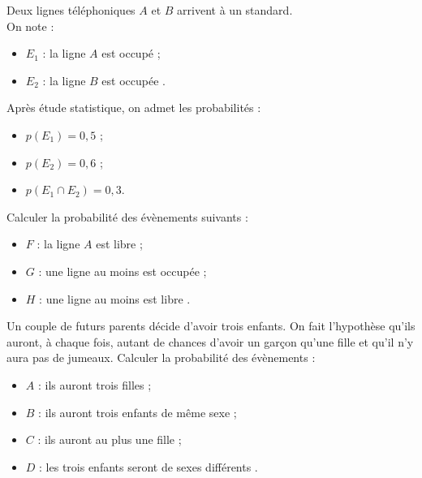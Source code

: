 \begin{exo}
Deux lignes t\'el\'ephoniques $A$ et $B$ arrivent \`a un standard.\\ On note :
\vspace{-1em}\begin{multicols}{2}
\begin{itemize}
	\item $E_1$ : \og la ligne $A$ est occup\'e \fg ;
	\item $E_2$ : \og la ligne $B$ est occup\'ee \fg.
\end{itemize}
\end{multicols}\vspace{-1em}
Apr\`es \'etude statistique, on admet les probabilit\'es :
\vspace{-1em}\begin{multicols}{3}
\begin{itemize}
	\item $p(E_1) = 0,5$ ;
	\item $p(E_2) = 0,6$ ;
	\item $p(E_1 \cap E_2) = 0,3$.
\end{itemize}
\end{multicols}\vspace{-1em}
Calculer la probabilit\'e des \'ev\`enements suivants :
\vspace{-1em}\begin{multicols}{2}
\begin{itemize}
	\item $F$ : \og la ligne $A$ est libre \fg ;
	\item $G$ : \og une ligne au moins est occup\'ee \fg ;
	\item $H$ : \og une ligne au moins est libre \fg.
\end{itemize}
\end{multicols}\vspace{-1em}
\end{exo}





\begin{exo}
Un couple de futurs parents d\'ecide d'avoir trois enfants.
On fait l'hypoth\`ese qu'ils auront, \`a chaque fois, autant de chances d'avoir un garçon qu'une fille et qu'il n'y aura pas de jumeaux.
Calculer la probabilit\'e des \'ev\`enements :
\begin{itemize}
	\item $A$ : \og ils auront trois filles \fg ;
	\item $B$ : \og ils auront trois enfants de même sexe \fg ;
	\item $C$ : \og ils auront au plus une fille \fg ;
	\item $D$ : \og les trois enfants seront de sexes diff\'erents \fg.
\end{itemize}
\end{exo}

